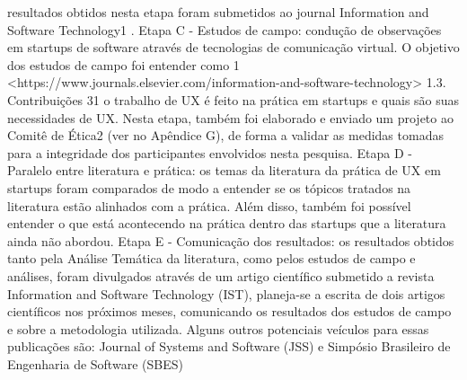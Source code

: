 resultados obtidos nesta etapa foram submetidos ao journal Information and Software
Technology1
.
Etapa C - Estudos de campo: condução de observações em startups de software através
de tecnologias de comunicação virtual. O objetivo dos estudos de campo foi entender como
1 <https://www.journals.elsevier.com/information-and-software-technology>
1.3. Contribuições 31
o trabalho de UX é feito na prática em startups e quais são suas necessidades de UX.
Nesta etapa, também foi elaborado e enviado um projeto ao Comitê de Ética2
(ver no
Apêndice G), de forma a validar as medidas tomadas para a integridade dos participantes
envolvidos nesta pesquisa.
Etapa D - Paralelo entre literatura e prática: os temas da literatura da prática
de UX em startups foram comparados de modo a entender se os tópicos tratados na
literatura estão alinhados com a prática. Além disso, também foi possível entender o que
está acontecendo na prática dentro das startups que a literatura ainda não abordou.
Etapa E - Comunicação dos resultados: os resultados obtidos tanto pela Análise
Temática da literatura, como pelos estudos de campo e análises, foram divulgados através
de um artigo científico submetido a revista Information and Software Technology (IST),
planeja-se a escrita de dois artigos científicos nos próximos meses, comunicando os resultados
dos estudos de campo e sobre a metodologia utilizada. Alguns outros potenciais veículos
para essas publicações são: Journal of Systems and Software (JSS) e Simpósio Brasileiro
de Engenharia de Software (SBES)